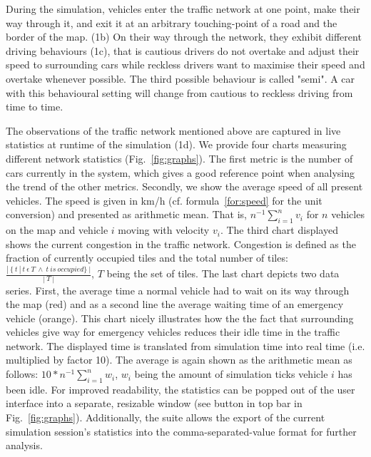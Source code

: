 During the simulation, vehicles enter the traffic network at one point, make their way through it, and exit it at an arbitrary touching-point of a road and the border of the map. (1b) On their way through the network, they exhibit different driving behaviours (1c), that is cautious drivers do not overtake and adjust their speed to surrounding cars while reckless drivers want to maximise their speed and overtake whenever possible. The third possible behaviour is called "semi". A car with this behavioural setting will change from cautious to reckless driving from time to time.

The observations of the traffic network mentioned above are captured in live statistics at runtime of the simulation (1d).  We provide four charts measuring different network statistics (Fig.~\ref{fig:graphs}). The first metric is the number of cars currently in the system, which gives a good reference point when analysing the trend of the other metrics. Secondly, we show the average speed of all present vehicles. The speed is given in km/h (cf. formula~\ref{for:speed} for the unit conversion) and presented as arithmetic mean. That is, $ n^{-1}\sum\limits_{i=1}^n v_i$ for $n$ vehicles on the map and vehicle $i$ moving with velocity $v_i$. The third chart displayed shows the current congestion in the traffic network. Congestion is defined as the fraction of currently occupied tiles and the total number of tiles: $\frac{|\:\lbrace \:t\:|\:t\:\epsilon\:T\:\wedge\:t\:is\:occupied\rbrace\:|}{|\:T\:|}$, $T$ being the set of tiles. The last chart depicts two data series. First, the average time a normal vehicle had to wait on its way through the map (red) and as a second line the average waiting time of an emergency vehicle (orange). This chart nicely illustrates how the the fact that surrounding vehicles give way for emergency vehicles reduces their idle time in the traffic network. The displayed time is translated from simulation time into real time (i.e. multiplied by factor 10). The average is again shown as the arithmetic mean as follows: $10*n^{-1}\sum\limits_{i=1}^n w_i$, $w_i$ being the amount of simulation ticks vehicle $i$ has been idle. For improved readability, the statistics can be popped out of the user interface into a separate, resizable window (see button in top bar in Fig.~\ref{fig:graphs}). Additionally, the suite allows the export of the current simulation session's statistics into the comma-separated-value format for further analysis.

